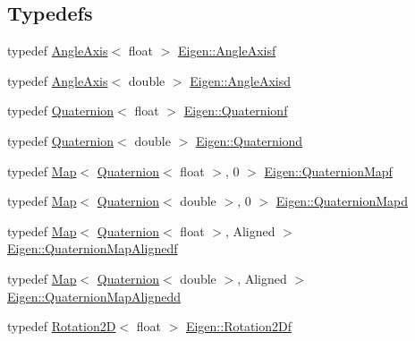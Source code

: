 \subsection*{Typedefs}
\begin{DoxyCompactItemize}
\item 
typedef \mbox{\hyperlink{class_eigen_1_1_angle_axis}{Angle\+Axis}}$<$ float $>$ \mbox{\hyperlink{group___geometry___module_gad823b9c674644b14d950fbfe165dfdbf}{Eigen\+::\+Angle\+Axisf}}
\item 
typedef \mbox{\hyperlink{class_eigen_1_1_angle_axis}{Angle\+Axis}}$<$ double $>$ \mbox{\hyperlink{group___geometry___module_gaed936d6e9192d97f00a9608081fa9b64}{Eigen\+::\+Angle\+Axisd}}
\item 
typedef \mbox{\hyperlink{class_eigen_1_1_quaternion}{Quaternion}}$<$ float $>$ \mbox{\hyperlink{group___geometry___module_ga66aa915a26d698c60ed206818c3e4c9b}{Eigen\+::\+Quaternionf}}
\item 
typedef \mbox{\hyperlink{class_eigen_1_1_quaternion}{Quaternion}}$<$ double $>$ \mbox{\hyperlink{group___geometry___module_ga5daab8e66aa480465000308455578830}{Eigen\+::\+Quaterniond}}
\item 
typedef \mbox{\hyperlink{class_eigen_1_1_map}{Map}}$<$ \mbox{\hyperlink{class_eigen_1_1_quaternion}{Quaternion}}$<$ float $>$, 0 $>$ \mbox{\hyperlink{group___geometry___module_ga867ff508ac860bdf7cab3b8a8fc1048d}{Eigen\+::\+Quaternion\+Mapf}}
\item 
typedef \mbox{\hyperlink{class_eigen_1_1_map}{Map}}$<$ \mbox{\hyperlink{class_eigen_1_1_quaternion}{Quaternion}}$<$ double $>$, 0 $>$ \mbox{\hyperlink{group___geometry___module_ga89412d1dcf23537e5990dfb3089ace76}{Eigen\+::\+Quaternion\+Mapd}}
\item 
typedef \mbox{\hyperlink{class_eigen_1_1_map}{Map}}$<$ \mbox{\hyperlink{class_eigen_1_1_quaternion}{Quaternion}}$<$ float $>$, Aligned $>$ \mbox{\hyperlink{group___geometry___module_gadaf7f3ee984d9828ca94d66355f0b226}{Eigen\+::\+Quaternion\+Map\+Alignedf}}
\item 
typedef \mbox{\hyperlink{class_eigen_1_1_map}{Map}}$<$ \mbox{\hyperlink{class_eigen_1_1_quaternion}{Quaternion}}$<$ double $>$, Aligned $>$ \mbox{\hyperlink{group___geometry___module_ga4289f38cc6ecf302e07d2365abc6a902}{Eigen\+::\+Quaternion\+Map\+Alignedd}}
\item 
typedef \mbox{\hyperlink{class_eigen_1_1_rotation2_d}{Rotation2D}}$<$ float $>$ \mbox{\hyperlink{group___geometry___module_ga35e2cace3ada497794734edb8bc33b6e}{Eigen\+::\+Rotation2\+Df}}
\item 

\end{DoxyCompactItemize}
